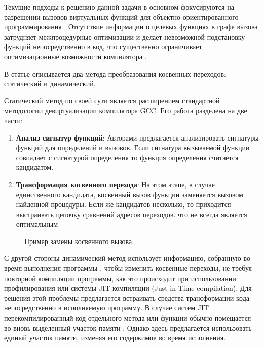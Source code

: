 Текущие подходы к решению данной задачи в основном фокусируются на разрешении вызовов виртуальных функций для объектно-ориентированного программирования \cite{namolaru2006devirtualization,padlewski2017devirtualization}. Отсутствие информации о целевых функциях в графе вызова затрудняет межпроцедурные оптимизации и делает невозможной подстановку функций непосредственно в код, что существенно ограничивает оптимизационные возможности компилятора \cite{li2010lightweight,pande1996data}.


В статье \cite{chernonog2023статический} описывается два метода преобразования косвенных переходов: статический и динамический.  

Статический метод по своей сути является расширением стандартной методологии девиртуализации компилятора GCC. Его работа разделена на две части:

\begin{enumerate}
	\item \textbf{Анализ сигнатур функций}: Авторами предлагается анализировать сигнатуры функций для определений и вызовов. Если сигнатура вызываемой функции совпадает с сигнатурой определения то функция определения считается кандидатом.
	\item \textbf{Трансформация косвенного перехода}: На этом этапе, в случае единственного кандидата, косвенный вызов функции заменяется вызовом найденной процедуры. Если же кандидатов несколько, то приходится выстраивать цепочку сравнений адресов переходов. что не всегда является оптимальным
\end{enumerate}


\begin{figure}[ht]
	\caption{Пример замены косвенного вызова.}\label{fig:ICP1}
\end{figure}

С другой стороны динамический метод использует информацию, собранную во время выполнения программы \cite{baev2015profile,ishizaki2000study}, чтобы изменить косвенные переходы, не требуя повторной компиляции программы, как это происходит при использовании профилирования или системы JIT-компиляции (Just-in-Time compilation). Для решения этой проблемы предлагается встраивать средства трансформации кода непосредственно в исполняемую программу. В случае систем JIT перекомпилированный код отдельного метода или функции обычно помещается во вновь выделенный участок памяти \cite{cravvford1988study}. Однако здесь предлагается использовать единый участок памяти, изменяя его содержимое во время исполнения.

